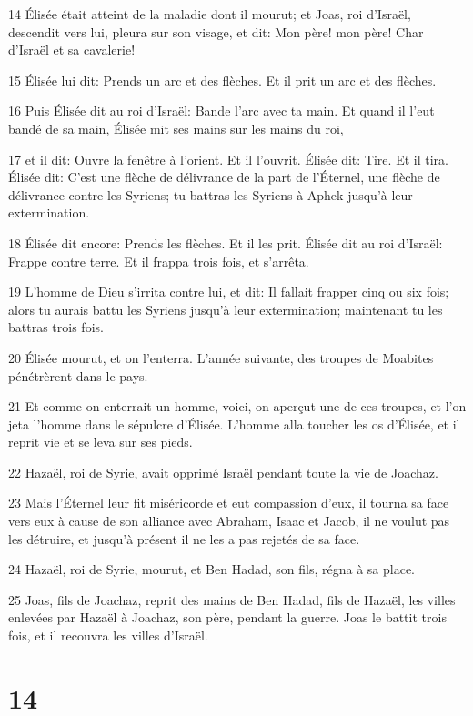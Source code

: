 \par 14 Élisée était atteint de la maladie dont il mourut; et Joas, roi d'Israël, descendit vers lui, pleura sur son visage, et dit: Mon père! mon père! Char d'Israël et sa cavalerie!
\par 15 Élisée lui dit: Prends un arc et des flèches. Et il prit un arc et des flèches.
\par 16 Puis Élisée dit au roi d'Israël: Bande l'arc avec ta main. Et quand il l'eut bandé de sa main, Élisée mit ses mains sur les mains du roi,
\par 17 et il dit: Ouvre la fenêtre à l'orient. Et il l'ouvrit. Élisée dit: Tire. Et il tira. Élisée dit: C'est une flèche de délivrance de la part de l'Éternel, une flèche de délivrance contre les Syriens; tu battras les Syriens à Aphek jusqu'à leur extermination.
\par 18 Élisée dit encore: Prends les flèches. Et il les prit. Élisée dit au roi d'Israël: Frappe contre terre. Et il frappa trois fois, et s'arrêta.
\par 19 L'homme de Dieu s'irrita contre lui, et dit: Il fallait frapper cinq ou six fois; alors tu aurais battu les Syriens jusqu'à leur extermination; maintenant tu les battras trois fois.
\par 20 Élisée mourut, et on l'enterra. L'année suivante, des troupes de Moabites pénétrèrent dans le pays.
\par 21 Et comme on enterrait un homme, voici, on aperçut une de ces troupes, et l'on jeta l'homme dans le sépulcre d'Élisée. L'homme alla toucher les os d'Élisée, et il reprit vie et se leva sur ses pieds.
\par 22 Hazaël, roi de Syrie, avait opprimé Israël pendant toute la vie de Joachaz.
\par 23 Mais l'Éternel leur fit miséricorde et eut compassion d'eux, il tourna sa face vers eux à cause de son alliance avec Abraham, Isaac et Jacob, il ne voulut pas les détruire, et jusqu'à présent il ne les a pas rejetés de sa face.
\par 24 Hazaël, roi de Syrie, mourut, et Ben Hadad, son fils, régna à sa place.
\par 25 Joas, fils de Joachaz, reprit des mains de Ben Hadad, fils de Hazaël, les villes enlevées par Hazaël à Joachaz, son père, pendant la guerre. Joas le battit trois fois, et il recouvra les villes d'Israël.

\chapter{14}


